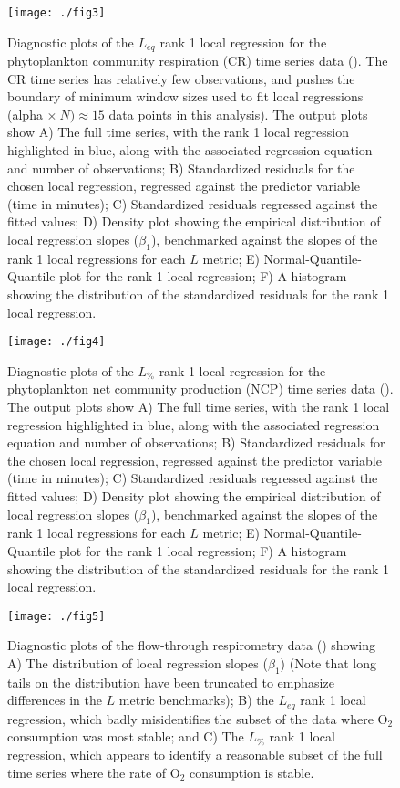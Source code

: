 \documentclass[11pt]{article}
\newcommand{\code}{\fontfamily{pcr}\selectfont}
\begin{document}
\begin{figure}[!ht]
\texttt{[image: ./fig3]}
\caption{Diagnostic plots of the $L_{eq}$ rank 1 local regression for the phytoplankton community respiration (CR) time series data (\citealt{YvonDurocher2015}). The CR time series has relatively few observations, and pushes the boundary of minimum window sizes used to fit local regressions ({\code alpha} $\times~N) \approx 15$ data points in this analysis). The output plots show A) The full time series, with the rank 1 local regression highlighted in blue, along with the associated regression equation and number of observations; B) Standardized residuals for the chosen local regression, regressed against the predictor variable (time in minutes); C) Standardized residuals regressed against the fitted values; D) Density plot showing the empirical distribution of local regression slopes ($\beta_1$), benchmarked against the slopes of the rank 1 local regressions for each $L$ metric; E) Normal-Quantile-Quantile plot for the rank 1 local regression; F) A histogram showing the distribution of the standardized residuals for the rank 1 local regression.}
\label{Fig:fig3.eps}
\end{figure}
\newpage{}

\begin{figure}[!ht]
\texttt{[image: ./fig4]}
\caption{Diagnostic plots of the $L_{\%}$ rank 1 local regression for the phytoplankton net community production (NCP) time series data (\citealt{YvonDurocher2015}). The output plots show A) The full time series, with the rank 1 local regression highlighted in blue, along with the associated regression equation and number of observations; B) Standardized residuals for the chosen local regression, regressed against the predictor variable (time in minutes); C) Standardized residuals regressed against the fitted values; D) Density plot showing the empirical distribution of local regression slopes ($\beta_1$), benchmarked against the slopes of the rank 1 local regressions for each $L$ metric; E) Normal-Quantile-Quantile plot for the rank 1 local regression; F) A histogram showing the distribution of the standardized residuals for the rank 1 local regression.}
\label{Fig:fig4.eps}
\end{figure}
\newpage{}


\begin{figure}[ht!]
\texttt{[image: ./fig5]}
\caption{Diagnostic plots of the flow-through respirometry data (\citealt{White2011}) showing A) The distribution of local regression slopes ($\beta_1$) (Note that long tails on the distribution have been truncated to emphasize differences in the $L$ metric benchmarks); B) the $L_{eq}$ rank 1 local regression, which badly misidentifies the subset of the data where O$_2$ consumption was most stable; and C) The $L_\%$ rank 1 local regression, which appears to identify a reasonable subset of the full time series where the rate of O$_2$ consumption is stable.}
\label{Fig:fig5.eps}
\end{figure}
\newpage{}
\end{document}
